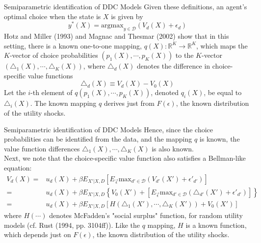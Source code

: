 \documentclass[xcolor=pdftex,dvipsnames,table,mathserif]{beamer}
\begin{document}
\begin{frame}{Semiparametric identification of DDC Models}
Given these definitions, an agent's optimal choice when the state is $X$ is given by 
\begin{equation*}
y^* (X) = \text{argmax}_{y \in \mathcal{D}} (V_d(X) + \epsilon_d)
\end{equation*}
Hotz and Miller (1993) and Magnac and Thesmar (2002) show that in this setting, there is a known one-to-one mapping, $q(X) : \mathbb{R}^K \rightarrow \mathbb{R}^K$, which maps the $K$-vector of choice probabilities $(p_1(X), \cdots , p_K(X))$ to the $K$-vector $(\triangle_1(X), \cdots , \triangle_K (X))$, where $\triangle_d(X)$ denotes the difference in choice-specific value functions
\begin{equation*}
\triangle_d(X) \equiv V_d(X) - V_0(X)
\end{equation*}
Let the $i$-th element of $q(p_1(X), \cdots, p_K(X))$, denoted $q_i(X)$, be equal to $\triangle_i(X)$. The known mapping $q$ derives just from $F(\epsilon)$, the known distribution of the utility shocks. \\
\end{frame}

\begin{frame}{Semiparametric identification of DDC Models}
Hence, since the choice probabilities can be identified from the data, and the mapping $q$ is known, the value function differences $\triangle_1(X), \cdots, \triangle_K(X)$ is also known. \\
\vspace{2mm}
Next, we note that the choice-specific value function also satisfies a Bellman-like equation:
\begin{equation}
\begin{split}
V_d(X) = & u_d(X) + \beta E_{X'|X,D} \left [ E_{\vec{\epsilon}} \text{max}_{d' \in \mathcal{D}} (V_{d'} (X') + \epsilon'_{d'}) \right ] \\
= & u_d(X) + \beta E_{X'|X,D} \left \{ V_0 (X') + \left [ E_{\vec{\epsilon}} \text{max}_{d' \in \mathcal{D}} (\triangle_{d'} (X') + \epsilon'_{d'}) \right ] \right \} \\
= & u_d(X) + \beta E_{X'|X,D} [ H(\triangle_1 (X'), \cdots, \triangle_K(X')) + V_0(X') ]
\end{split}
\end{equation}
where $H(\cdots)$ denotes McFadden's "social surplus" function, for random utility models (cf. Rust (1994, pp. 3104ff)). Like the $q$ mapping, $H$ is a known function, which depends just on $F(\epsilon)$, the known distribution of the utility shocks. 
\end{frame}
\end{document}
